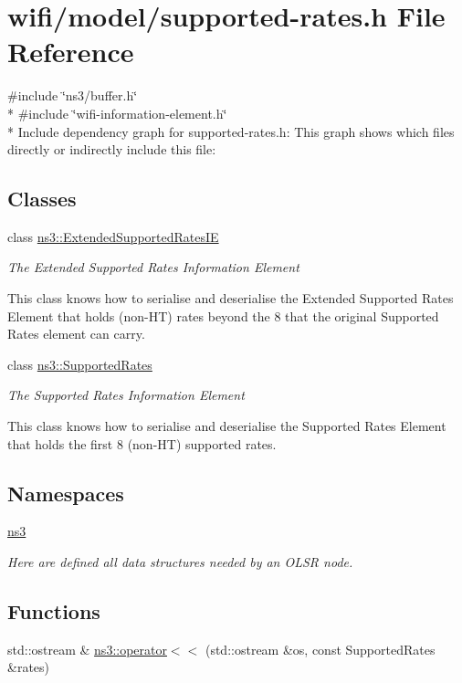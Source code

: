 \hypertarget{supported-rates_8h}{}\section{wifi/model/supported-\/rates.h File Reference}
\label{supported-rates_8h}
{\ttfamily \#include \char`\"{}ns3/buffer.\+h\char`\"{}}\\*
{\ttfamily \#include \char`\"{}wifi-\/information-\/element.\+h\char`\"{}}\\*
Include dependency graph for supported-\/rates.h\+:
This graph shows which files directly or indirectly include this file\+:
\subsection*{Classes}
\begin{DoxyCompactItemize}
\item 
class \hyperlink{classns3_1_1ExtendedSupportedRatesIE}{ns3\+::\+Extended\+Supported\+Rates\+IE}
\begin{DoxyCompactList}\small\item\em The Extended Supported Rates Information Element

This class knows how to serialise and deserialise the Extended Supported Rates Element that holds (non-\/\+HT) rates beyond the 8 that the original Supported Rates element can carry. \end{DoxyCompactList}\item 
class \hyperlink{classns3_1_1SupportedRates}{ns3\+::\+Supported\+Rates}
\begin{DoxyCompactList}\small\item\em The Supported Rates Information Element

This class knows how to serialise and deserialise the Supported Rates Element that holds the first 8 (non-\/\+HT) supported rates. \end{DoxyCompactList}\end{DoxyCompactItemize}
\subsection*{Namespaces}
\begin{DoxyCompactItemize}
\item 
 \hyperlink{namespacens3}{ns3}
\begin{DoxyCompactList}\small\item\em Here are defined all data structures needed by an O\+L\+SR node. \end{DoxyCompactList}\end{DoxyCompactItemize}
\subsection*{Functions}
\begin{DoxyCompactItemize}
\item 
std\+::ostream \& \hyperlink{namespacens3_a0017789c3fd3a17879db574f36fa4e80}{ns3\+::operator$<$$<$} (std\+::ostream \&os, const Supported\+Rates \&rates)
\end{DoxyCompactItemize}
